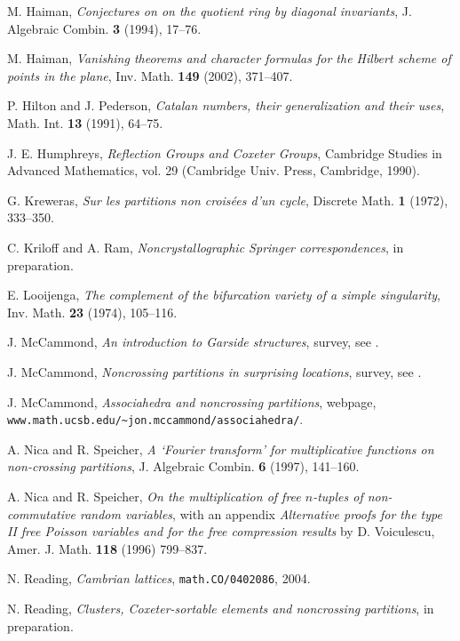 \documentclass[12pt,letterpaper, reqno]{aimpl}
\begin{document}
\begin{thebibliography}{99}
M. Haiman, \emph{Conjectures on  on the quotient ring by diagonal invariants}, J. Algebraic Combin. {\bf 3} (1994), 17--76.

M. Haiman, \emph{Vanishing theorems and character formulas for the Hilbert scheme of points in the plane}, Inv. Math. {\bf 149} (2002), 371--407.

P. Hilton and J. Pederson, \emph{Catalan numbers, their generalization and their uses}, Math. Int. {\bf 13} (1991), 64--75.

J. E. Humphreys, \emph{Reflection Groups and Coxeter Groups}, Cambridge Studies in Advanced Mathematics, vol. 29 (Cambridge Univ. Press, Cambridge, 1990).

G. Kreweras, \emph{Sur les partitions non crois\'ees d'un cycle}, Discrete Math. {\bf 1} (1972), 333--350.

C. Kriloff and A. Ram, \emph{Noncrystallographic Springer correspondences}, in preparation.

E. Looijenga, \emph{The complement of the bifurcation variety of a simple singularity}, Inv. Math. {\bf 23} (1974), 105--116.

J. McCammond, \emph{An introduction to Garside structures}, survey, see \cite{mccammond:webpage}.

J. McCammond, \emph{Noncrossing partitions in surprising locations}, survey, see \cite{mccammond:webpage}.

J. McCammond, \emph{Associahedra and noncrossing partitions}, webpage, \verb+www.math.ucsb.edu/~jon.mccammond/associahedra/+.

A. Nica and R. Speicher, \emph{A `Fourier transform' for multiplicative functions on non-crossing partitions}, J. Algebraic Combin. {\bf 6} (1997), 141--160.

A. Nica and R. Speicher, \emph{On the multiplication of free $n$-tuples of non-commutative random variables}, with an appendix {\em Alternative proofs for the type II free Poisson variables and for the free compression results} by D. Voiculescu, Amer. J. Math. {\bf 118} (1996) 799--837.

N. Reading, \emph{Cambrian lattices}, \texttt{math.CO/0402086}, 2004.

N. Reading, \emph{Clusters, Coxeter-sortable elements and noncrossing partitions}, in preparation.


\end{thebibliography}
\end{document}

